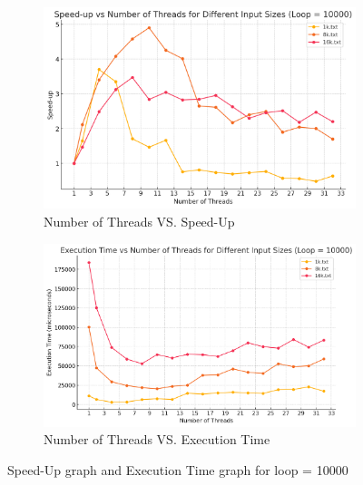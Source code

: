 \documentclass[letterpaper,12pt]{article}
\theoremstyle{remark}
\begin{document}
\begin{figure}[H]
    \centering
    \begin{subfigure}[t]{0.48\textwidth}  %
        \centering
        \includegraphics[width=\textwidth]{loop10000Yield.png}
        \caption{Number of Threads VS. Speed-Up}
        \label{fig:ThreadVsSpeedUp1}
    \end{subfigure}
    \hfill  %
    \begin{subfigure}[t]{0.48\textwidth}  %
        \centering
        \includegraphics[width=\textwidth]{loop10000YieldExecutionTime.png}
        \caption{Number of Threads VS. Execution Time}
        \label{fig:ThreadVsExecutionTime}
    \end{subfigure}
    \caption{Speed-Up graph and Execution Time graph for loop = 10000}
    \label{fig:ThreadVsComparison}
\end{figure}
\hfill  %
\end{document}
